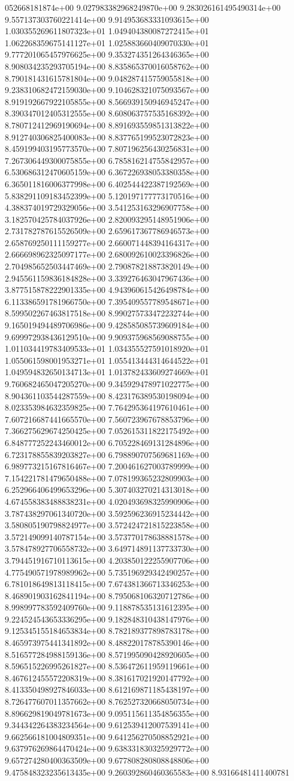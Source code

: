 052668181874e+00	9.027983382968249870e+00	9.283026161495490314e+00	9.557137303760221414e+00	9.914953683331093615e+00	1.030355269611807323e+01	1.049404380087272415e+01	1.062268359675141127e+01	1.025883660409070330e+01	9.777201065457976625e+00	9.353274351264346365e+00	8.908034235293705194e+00	8.835865370016058762e+00	8.790181431615781804e+00	9.048287415759055818e+00	9.238310682472159030e+00	9.104628321075093567e+00	8.919192667922105855e+00	8.566939150946945247e+00	8.390347012405312555e+00	8.608063757535168392e+00	8.780712412969190694e+00	8.891693559851313822e+00	8.912740306825400083e+00	8.837765199523072823e+00	8.459199403195773570e+00	7.807196256430256831e+00	7.267306449300075855e+00	6.785816214755842957e+00	6.530686312470605159e+00	6.367226938053380358e+00	6.365011816006377998e+00	6.402544422387192569e+00	5.838291109183452399e+00	5.120197177773170516e+00	4.388374019729329056e+00	3.541253163296907758e+00	3.182570425784037926e+00	2.820093295148951906e+00	2.731782787615526509e+00	2.659617367786946573e+00	2.658769250111159277e+00	2.660071448394164317e+00	2.666698962325097177e+00	2.680092610023396826e+00	2.704985652503447469e+00	2.790878218873820149e+00	2.945561159836184828e+00	3.339276463047967436e+00	3.877515878222901335e+00	4.943960615426498784e+00	6.113386591781966750e+00	7.395409557789548671e+00	8.599502267463817518e+00	8.990275733472232744e+00	9.165019494489706986e+00	9.428585085739609184e+00	9.699972938436129510e+00	9.909375968569088755e+00	1.011034419783409533e+01	1.034355527591018920e+01	1.055061598001953271e+01	1.055413444314644522e+01	1.049594832650134713e+01	1.013782433609274669e+01	9.760682465047205270e+00	9.345929478971022775e+00	8.904361103544287559e+00	8.423176389530198094e+00	8.023353984632359825e+00	7.764295364197610461e+00	7.607216687441665570e+00	7.560723967678853796e+00	7.366275629674250425e+00	7.052615311822175492e+00	6.848777252243460012e+00	6.705228469131284896e+00	6.723178855839203827e+00	6.798890707569681169e+00	6.989773215167816467e+00	7.200461627003789999e+00	7.154221781479650488e+00	7.078199365232809903e+00	6.252966406499653296e+00	5.307403270214313018e+00	4.674558383488838231e+00	4.020493698325990906e+00	3.787438297061340720e+00	3.592596236915234442e+00	3.580805190798824977e+00	3.572424721815223858e+00	3.572149099140787154e+00	3.573770178638881578e+00	3.578478927706558732e+00	3.649714891137733730e+00	3.794451916710113615e+00	4.203850122255907706e+00	4.775490571978989962e+00	5.735196929342490257e+00	6.781018649813118415e+00	7.674381366713346253e+00	8.468901903162841194e+00	8.795068106320712786e+00	8.998997783592409760e+00	9.118878535131612395e+00	9.224524543653336295e+00	9.182848310438147976e+00	9.125345155184653834e+00	8.782189377898783178e+00	8.465973975441341892e+00	8.488220178785390146e+00	8.516577284988159136e+00	8.571995090428920605e+00	8.596515226995261827e+00	8.536472611959119661e+00	8.467612455572208319e+00	8.381617021920147792e+00	8.413350498927846033e+00	8.612169871185438197e+00	8.726477607011357662e+00	8.762527320668050734e+00	8.896629819049781673e+00	9.095115611354856355e+00	9.344342264383234564e+00	9.612539412007539141e+00	9.662566181004809351e+00	9.641256270508852921e+00	9.637976269864470424e+00	9.638331830325929772e+00	9.657274280400363509e+00	9.677808280808848806e+00	9.475848323235613435e+00	9.260392860460365583e+00	8.93166481411400781